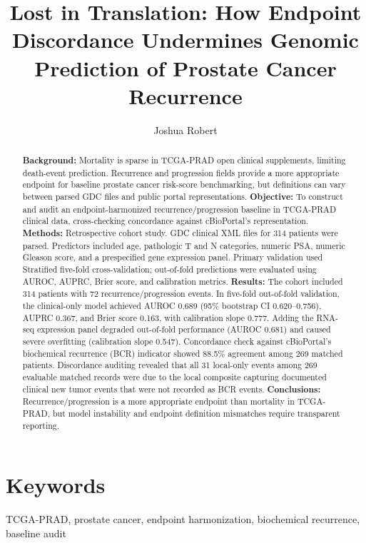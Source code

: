 \documentclass[11pt]{article}
\title{\textbf{Lost in Translation: How Endpoint Discordance Undermines Genomic Prediction of Prostate Cancer Recurrence}}
\author[1,2]{Joshua Robert}
\affil[1]{TAMU School of Engineering Medicine}
\affil[2]{Houston Methodist Hospital}
\date{}
\begin{document}
\maketitle

\begin{abstract}
\textbf{Background:} Mortality is sparse in TCGA-PRAD open clinical supplements, limiting death-event prediction. Recurrence and progression fields provide a more appropriate endpoint for baseline prostate cancer risk-score benchmarking, but definitions can vary between parsed GDC files and public portal representations.
\textbf{Objective:} To construct and audit an endpoint-harmonized recurrence/progression baseline in TCGA-PRAD clinical data, cross-checking concordance against cBioPortal's representation.
\textbf{Methods:} Retrospective cohort study. GDC clinical XML files for 314 patients were parsed. Predictors included age, pathologic T and N categories, numeric PSA, numeric Gleason score, and a prespecified gene expression panel. Primary validation used Stratified five-fold cross-validation; out-of-fold predictions were evaluated using AUROC, AUPRC, Brier score, and calibration metrics.
\textbf{Results:} The cohort included 314 patients with 72 recurrence/progression events. In five-fold out-of-fold validation, the clinical-only model achieved AUROC 0.689 (95\% bootstrap CI 0.620--0.756), AUPRC 0.367, and Brier score 0.163, with calibration slope 0.777. Adding the RNA-seq expression panel degraded out-of-fold performance (AUROC 0.681) and caused severe overfitting (calibration slope 0.547). Concordance check against cBioPortal's biochemical recurrence (BCR) indicator showed 88.5\% agreement among 269 matched patients. Discordance auditing revealed that all 31 local-only events among 269 evaluable matched records were due to the local composite capturing documented clinical new tumor events that were not recorded as BCR events.
\textbf{Conclusions:} Recurrence/progression is a more appropriate endpoint than mortality in TCGA-PRAD, but model instability and endpoint definition mismatches require transparent reporting.
\end{abstract}

\section*{Keywords}
TCGA-PRAD, prostate cancer, endpoint harmonization, biochemical recurrence, baseline audit
\end{document}

